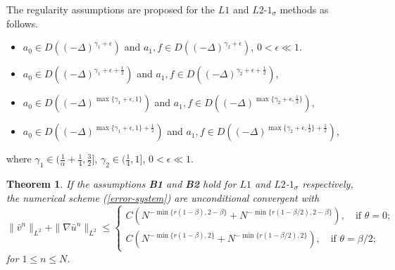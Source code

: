 \documentclass[11pt]{article}
\newtheorem{theorem}{Theorem}
\numberwithin{equation}{section}
\begin{document}
 The regularity assumptions are proposed for the $L1$ and $L2$-$1_\sigma$ methods as follows.
\begin{itemize}
    \item[\textbf{B1.}] $a_0\in D((-\Delta)^{\gamma_1+\epsilon})$ and $a_1,f\in D((-\Delta)^{\gamma_2+\epsilon})$,  $0<\epsilon \ll 1$.
    \item[\textbf{B2.}] $a_0\in D((-\Delta)^{\gamma_1+\epsilon+\frac12})$ and $a_1,f\in D((-\Delta)^{\gamma_2+\epsilon+\frac12})$, 
    \item[\textbf{B3.}] $a_0\in D((-\Delta)^{\max\{\gamma_1+\epsilon,1\}})$ and $a_1,f\in D((-\Delta)^{\max\{\gamma_2+\epsilon,\frac12\}})$, 
    \item[\textbf{B4.}] $a_0\in D((-\Delta)^{\max\{\gamma_1+\epsilon,1\}+\frac12})$  and $a_1,f\in D((-\Delta)^{\max\{\gamma_2+\epsilon,\frac12\}+\frac12})$,
\end{itemize}
where $\gamma_1\in(\frac{1}{\alpha}+\frac{1}{4},\frac32]$, $\gamma_2\in(\frac{1}{4},1]$, $0<\epsilon \ll 1$.
\begin{theorem}\label{thm-conv-1}
If the assumptions \textbf{B1} and \textbf{B2} hold for $L1$ and $L2$-$1_\sigma$ respectively, the numerical scheme (\ref{error-system}) are unconditional convergent with
\[
\|\bar v^n\|_{L^2}+\|\nabla \bar u^n\|_{L^2} \le
\begin{cases}
C(N^{-\min\{r(1-\beta),2-\beta\}}+N^{-\min\{r(1-\beta/2),2-\beta\}}), \quad \text{if } \theta=0;\\
C(N^{-\min\{r(1-\beta),2\}}+N^{-\min\{r(1-\beta/2),2\}}),\quad \text{if } \theta=\beta/2;
\end{cases}
\]
for $1 \leq n \leq N$.
\end{theorem}
\end{document}
